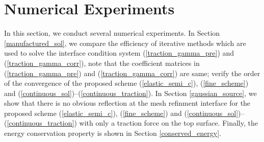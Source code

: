 \section{Numerical Experiments}
In this section, we conduct several numerical experiments. In Section \ref{manufactured_sol}, we compare the efficiency of iterative methods which are used to solve the interface condition system (\ref{traction_gamma_pre}) and (\ref{traction_gamma_corr}), note that the coefficient matrices in (\ref{traction_gamma_pre}) and (\ref{traction_gamma_corr}) are same; verify the order of the convergence of the proposed scheme (\ref{elastic_semi_c}), (\ref{fine_scheme}) and (\ref{continuous_sol})--(\ref{continuous_traction}). In Section \ref{gaussian_source}, we show that there is no obvious reflection at the mesh refinment interface for the proposed scheme (\ref{elastic_semi_c}), (\ref{fine_scheme}) and (\ref{continuous_sol})--(\ref{continuous_traction}) with only a traction force on the top surface. Finally, the energy conservation property is shown in Section \ref{conserved_energy}.
